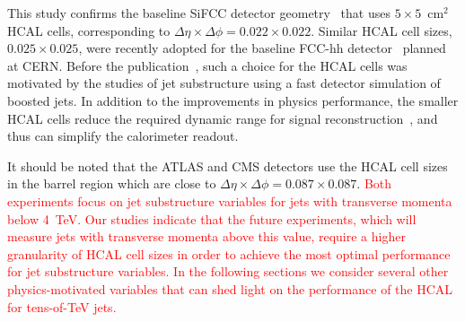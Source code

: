 This study confirms the baseline SiFCC detector geometry~\cite{Chekanov:2016ppq} that uses $5 \times 5$~cm$^2$ HCAL cells,
corresponding to $\Delta \eta \times \Delta \phi = 0.022\times0.022$.
Similar HCAL cell sizes,  $0.025\times0.025$,  were recently adopted for the baseline FCC-hh detector~\cite{fcc1,fcc2} planned at CERN.
Before the publication~\cite{Chekanov:2016ppq},   such a choice for the HCAL cells   
was motivated by the studies of jet substructure  using a fast detector simulation of boosted jets.
In addition to the improvements in physics performance, the smaller HCAL cells 
reduce the required dynamic range for 
signal reconstruction~\cite{Chekanov:2015ihl}, and thus can simplify the calorimeter readout.

It should be noted that the ATLAS and CMS detectors use the HCAL cell sizes in the barrel region which are close to 
$\Delta \eta \times \Delta \phi = 0.087\times 0.087$. \textcolor{red}{Both experiments focus on jet substructure variables for jets with 
transverse momenta below 4~TeV.
Our studies indicate that the future experiments, which will measure 
jets with transverse momenta above this value, require a higher
granularity of HCAL cell sizes in order to achieve the most optimal 
performance for jet substructure variables.
In the following sections we consider several other physics-motivated
variables that can shed light on the performance of the HCAL for tens-of-TeV jets.}



